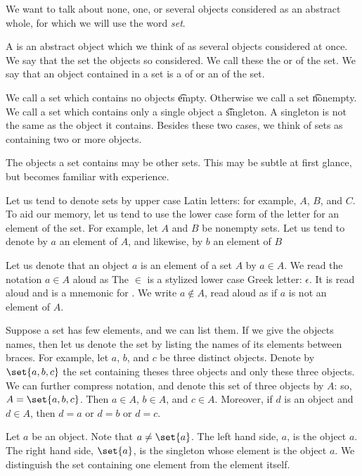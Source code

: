 

We want to talk
about none, one, or
several objects considered
as an abstract whole,
for which we will use
the word \textit{set}.


A  is an abstract
object which we think of as
several objects considered
at once.
We say that the set
the objects so considered.
We call these
the
 or
 of the set.
We say that an object
contained in a set is a
 of or an
 of the set.

We call a set which contains no objects \t{empty}.
Otherwise we call a set \t{nonempty}.
We call a set which contains only a single object a \t{singleton}.
A singleton is not the same as the object it contains.
Besides these two cases, we think of sets as containing two or more objects.

The objects a set contains
may be other sets.
This may be subtle at
first glance, but becomes
familiar with experience.


Let us tend to
denote sets by
upper case Latin letters:
for example,
$A$, $B$, and $C$.
To aid our memory,
let us tend to use the lower
case form of the letter for
an element of the set.
For example,
let $A$ and $B$ be
nonempty sets.
Let us tend to denote by
$a$ an element of $A$,
and likewise,
by $b$ an element of $B$

Let us denote that
an object $a$
is an element of a set $A$
by $a \in A$.
We read the notation
$a \in A$ aloud as 
The $\in$ is a stylized
lower case Greek letter: $\epsilon$.
It is
read aloud  and
is a mnemonic for .
We write $a \not\in A$, read aloud
as  if $a$ is not
an element of $A$.

Suppose a set has few elements,
and we can list them.
If we give the objects names,
then let us denote the
set by listing
the names of its elements
between braces.
For example,
let $a$, $b$, and $c$
be three distinct objects.
Denote by $\set{a, b, c}$
the set containing theses
three objects and only these
three objects.
We can further compress notation,
and denote this set of
three objects by $A$:
so, $A = \set{a, b, c}$.
Then $a \in A$,
$b \in A$, and $c \in A$.
Moreover, if $d$
is an object and
$d \in A$, then $d = a$
or $d = b$ or $d = c$.

Let $a$ be an object.
Note that
$a \neq \set{a}$.
The left hand side, $a$,
is the object $a$.
The right hand side, $\set{a}$, is
the singleton whose element
is the object $a$.
We distinguish the set
containing one element from the
element itself.


